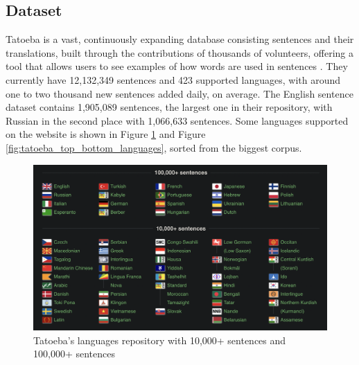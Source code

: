 \documentclass[a4paper]{article}
\begin{document}
\subsection{Dataset}

Tatoeba is a vast, continuously expanding database consisting sentences and their translations, built through the contributions of thousands of volunteers, offering a tool that allows users to see examples of how words are used in sentences \cite{tatoeba}. They currently have 12,132,349 sentences and 423 supported languages, with around one to two thousand new sentences added daily, on average. The English sentence dataset contains 1,905,089 sentences, the largest one in their repository, with Russian in the second place with 1,066,633 sentences. Some languages supported on the website is shown in Figure \ref{fig:tatoeba_languages} and Figure \ref{fig:tatoeba_top_bottom_languages}, sorted from the biggest corpus.

\begin{figure}[htbp]
    \centering
    \includegraphics[width=0.9\linewidth]{images/tatoeba_languages.png}
    \caption{Tatoeba's languages repository with 10,000+ sentences and 100,000+ sentences \cite{tatoeba}}
    \label{fig:tatoeba_languages}
\end{figure}
\end{document}
